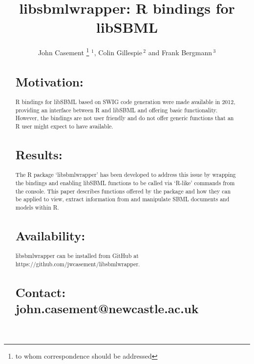 \documentclass{bioinfo}
\begin{document}

\title[libsbmlwrapper]{libsbmlwrapper: R bindings for libSBML}
\author[Casement \textit{et~al}]{John Casement \footnote{to whom correspondence should be addressed} $^{1}$, Colin Gillespie\,$^{2}$ and Frank Bergmann\,$^{3}$}
\address{$^{1}$Bioinformatics Support Unit, Newcastle University.\\
$^{2}$School of Mathematics and Statistics, Newcastle University.\\
$^{3}$ University of Heidelberg, or SBML Team?}



\maketitle

\begin{abstract}

\section{Motivation:}
R bindings for libSBML based on SWIG code generation were made available in 2012, providing an interface between R and libSBML and offering basic functionality. However, the bindings are not user friendly and do not offer generic functions that an R user might expect to have available.

\section{Results:}
The R package ‘libsbmlwrapper’ has been developed to address this issue by wrapping the bindings and enabling libSBML functions to be called via ‘R-like’ commands from the console. This paper describes functions offered by the package and how they can be applied to view, extract information from and manipulate SBML documents and models within R.

\section{Availability:}
libsbmlwrapper can be installed from GitHub at https://github.com/jwcasement/libsbmlwrapper.

\section{Contact: john.casement@newcastle.ac.uk}
\end{abstract}
\end{document}
